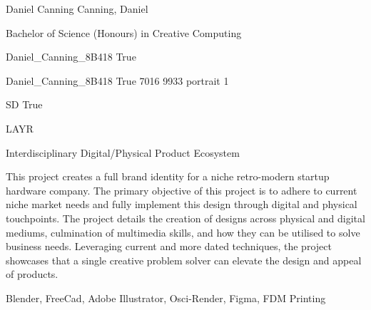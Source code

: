 \documentclass[twoside]{report}
\begin{document}
\begingroup{}\relax



\def\Key{Daniel_Canning_8B418}

{Daniel Canning}
{Canning, Daniel}

{Bachelor of Science (Honours) in Creative Computing}

{Daniel_Canning_8B418}
{True}

{Daniel_Canning_8B418}
{True}
{7016}
{9933}
{portrait}
{1}

{SD}
{True}

{LAYR}

{Interdisciplinary Digital/Physical Product Ecosystem}

{This project creates a full brand identity for a niche retro-modern startup hardware company. The primary objective
of this project is to adhere to current niche market needs and fully implement this design through digital and
physical touchpoints. The project details the creation of designs across physical and digital mediums, culmination of
multimedia skills, and how they can be utilised to solve business needs. Leveraging current and more dated
techniques, the project showcases that a single creative problem solver can elevate the design and appeal of
products.}

{Blender, FreeCad, Adobe Illustrator, Osci-Render, Figma, FDM Printing}
\end{document}

